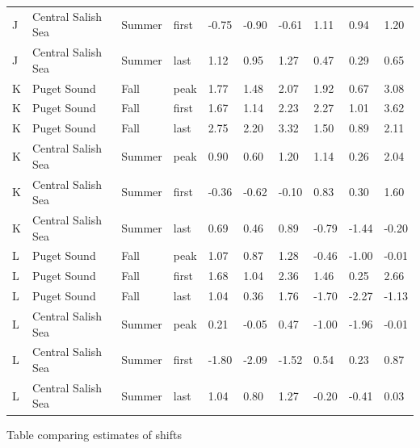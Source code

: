 \documentclass{article}
\begin{document}
\begin{table}[ht]
\begin{tabular}{|p{}|p{}|p{}|p{}|p{}p{}p{}|p{}p{}p{}|}
  J & Central Salish Sea & Summer & first & -0.75 & -0.90 & -0.61 & 1.11 & 0.94 & 1.20 \\ 
  J & Central Salish Sea & Summer & last & 1.12 & 0.95 & 1.27 & 0.47 & 0.29 & 0.65 \\ 
   \hline
K & Puget Sound & Fall & peak & 1.77 & 1.48 & 2.07 & 1.92 & 0.67 & 3.08 \\ 
  K & Puget Sound & Fall & first & 1.67 & 1.14 & 2.23 & 2.27 & 1.01 & 3.62 \\ 
  K & Puget Sound & Fall & last & 2.75 & 2.20 & 3.32 & 1.50 & 0.89 & 2.11 \\ 
  K & Central Salish Sea & Summer & peak & 0.90 & 0.60 & 1.20 & 1.14 & 0.26 & 2.04 \\ 
  K & Central Salish Sea & Summer & first & -0.36 & -0.62 & -0.10 & 0.83 & 0.30 & 1.60 \\ 
  K & Central Salish Sea & Summer & last & 0.69 & 0.46 & 0.89 & -0.79 & -1.44 & -0.20 \\ 
   \hline
L & Puget Sound & Fall & peak & 1.07 & 0.87 & 1.28 & -0.46 & -1.00 & -0.01 \\ 
  L & Puget Sound & Fall & first & 1.68 & 1.04 & 2.36 & 1.46 & 0.25 & 2.66 \\ 
  L & Puget Sound & Fall & last & 1.04 & 0.36 & 1.76 & -1.70 & -2.27 & -1.13 \\ 
  L & Central Salish Sea & Summer & peak & 0.21 & -0.05 & 0.47 & -1.00 & -1.96 & -0.01 \\ 
  L & Central Salish Sea & Summer & first & -1.80 & -2.09 & -1.52 & 0.54 & 0.23 & 0.87 \\ 
  L & Central Salish Sea & Summer & last & 1.04 & 0.80 & 1.27 & -0.20 & -0.41 & 0.03 \\ 
   \hline
\end{tabular}
\endgroup
\end{table}
\par Table comparing estimates of shifts
\end{document}
